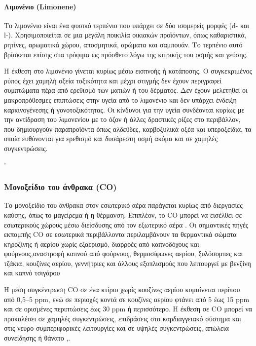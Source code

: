 \paragraph{Λιμονένιο (Limonene)}

Το λιμονένιο είναι ένα φυσικό τερπένιο που υπάρχει σε δύο ισομερείς μορφές (d- και l-). Χρησιμοποιείται σε μια μεγάλη ποικιλία οικιακών προϊόντων, όπως καθαριστικά, ρητίνες, αρωματικά χώρου, αποσμητικά, αρώματα και σαμπουάν. Το τερπένιο αυτό βρίσκεται επίσης στα τρόφιμα ως πρόσθετο λόγω της κιτρικής του οσμής και γεύσης.

Η έκθεση στο λιμονένιο γίνεται κυρίως μέσω εισπνοής ή κατάποσης. Ο συγκεκριμένος ρύπος έχει χαμηλή οξεία τοξικότητα και μέχρι στιγμής δεν έχουν περιγραφεί συμπτώματα πέρα από ερεθισμό των ματιών ή του δέρματος. Δεν έχουν μελετηθεί οι μακροπρόθεσμες επιπτώσεις στην υγεία από το λιμονένιο και δεν υπάρχει ένδειξη καρκινογένεσης ή γονοτοξικότητας. Οι κίνδυνοι για την υγεία συνδέονται κυρίως με την αντίδραση του λιμονενίου με το όζον ή άλλες δραστικές ρίζες στο περιβάλλον, που δημιουργούν παραπροϊόντα όπως αλδεΰδες, καρβοξυλικά οξέα και υπεροξείδια, τα οποία ευθύνονται για ερεθισμό και δυσάρεστη οσμή ακόμα και σε χαμηλές συγκεντρώσεις.

'
\subsubsection{Μονοξείδιο του άνθρακα (CO)}
Το μονοξείδιο του άνθρακα στον εσωτερικό αέρα παράγεται κυρίως από διεργασίες καύσης, όπως το μαγείρεμα ή η θέρμανση. Επιπλέον, το CO μπορεί να εισέλθει σε εσωτερικούς χώρους μέσω διείσδυσης από τον εξωτερικό αέρα . Οι σημαντικές πηγές εκπομπής CO σε εσωτερικά περιβάλλοντα περιλαμβάνουν τα θερμαντικά σώματα κηροζίνης ή αερίου χωρίς εξαερισμό, διαρροές από καπνοδόχους και φούρνους,αναστροφή καπνού από φούρνους, θερμοσίφωνες αερίου, ξυλόσομπες και τζάκια,
κουζίνες αερίου, γεννήτριες και άλλους εξοπλισμούς που λειτουργεί με βενζίνη και καπνό τσιγάρου

Η μέση συγκέντρωση CO σε ένα κτίριο χωρίς κουζίνες αερίου κυμαίνεται περίπου από 0,5–5 ppm, ενώ σε περιοχές κοντά σε κουζίνες αερίου φτάνει από 5 έως 15 ppm και σε ορισμένες περιπτώσεις έως 30 ppm ή περισσότερο. Η έκθεση σε CO μπορεί να προκαλέσει σε χαμηλές συγκεντρώσεις, επιδράσεις στο καρδιαγγειακό σύστημα και στις νευρο-συμπεριφορικές λειτουργίες και σε υψηλές συγκεντρώσεις, απώλεια συνείδησης ή θάνατο \cite{Raub20001},\cite{ijerph17082927}.


